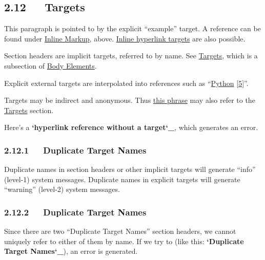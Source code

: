 \documentclass[10pt,a4paper,english]{article}
\begin{document}

\hypertarget{targets}{}
\subsection*{2.12~~~Targets}
\hypertarget{example}{}
This paragraph is pointed to by the explicit ``example'' target. A
reference can be found under \href{\#inline-markup}{Inline Markup}, above. \href{\#inline-hyperlink-targets}{Inline
hyperlink targets} are also possible.

Section headers are implicit targets, referred to by name. See
\href{\#targets}{Targets}, which is a subsection of \href{\#body-elements}{Body Elements}.

Explicit external targets are interpolated into references such as
``\href{http://www.python.org/}{Python} [\hyperlink{id21}{5}]''.

Targets may be indirect and anonymous.  Thus \href{\#targets}{this phrase} may also
refer to the \href{\#targets}{Targets} section.

Here's a {\color{red}\bfseries{}`hyperlink reference without a target`{\_}}, which generates an
error.



\hypertarget{duplicate-target-names}{}
\subsubsection*{2.12.1~~~Duplicate Target Names}

Duplicate names in section headers or other implicit targets will
generate ``info'' (level-1) system messages.  Duplicate names in
explicit targets will generate ``warning'' (level-2) system messages.



\hypertarget{id18}{}
\subsubsection*{2.12.2~~~Duplicate Target Names}

Since there are two ``Duplicate Target Names'' section headers, we
cannot uniquely refer to either of them by name.  If we try to (like
this: {\color{red}\bfseries{}`Duplicate Target Names`{\_}}), an error is generated.
\end{document}
